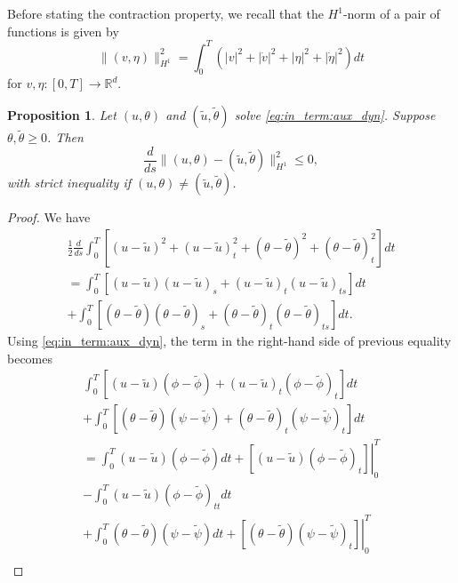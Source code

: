 \documentclass[12pt]{amsart}
\newcommand{\Rr}{{\mathbb{R}}}
\newcommand{\1}{{\chi}}
\newcommand{\lb}{\left(}
\newcommand{\rb}{\right)}
\newtheorem{pro}{Proposition}
\theoremstyle{definition}
\begin{document}
                Before stating the contraction property, we recall that the $H^1$-norm of a pair of functions is given by
                \[
                	\|(v, \eta)\|_{H^1}^2 = \int_0^T \lb |v|^2+|\dot v|^2+|\eta|^2+|\dot \eta|^2\rb dt
                \]
				for $v,\eta:[0,T]\to \Rr^d$. 
                \begin{pro}\label{contra1}
                        Let $(u, \theta)$ and $(\tilde u, \tilde \theta)$ solve \eqref{eq:in_term:aux_dyn}. Suppose $\theta, \tilde \theta \geq 0$. 
                        Then
                        \[
                        \frac{d}{ds}\|(u, \theta)-(\tilde u, \tilde \theta)\|^2_{H^1} \leq 0,
                        \]
                        with strict inequality if $(u, \theta)\neq (\tilde u, \tilde \theta)$.
                \end{pro}
                \begin{proof}
                	{We have
					\begin{equation*}
						\begin{split}
							\frac{1}{2} \frac{d}{ds} \int_0^T \left[ (u-\tilde u)^2 + (u-\tilde u)^2_t + (\theta-\tilde \theta)^2 + (\theta - \tilde \theta)^2_t \right]dt\\
							= \int_0^T \left[(u-\tilde u) (u-\tilde u)_s + (u-\tilde u)_t (u-\tilde u)_{ts}\right] dt\\
							+ \int_0^T \left[ (\theta-\tilde \theta)(\theta-\tilde \theta)_s  + (\theta-\tilde \theta)_t (\theta-\tilde \theta)_{ts}\right] dt.
						\end{split}
					\end{equation*}
					Using \eqref{eq:in_term:aux_dyn},  the term in the right-hand side of previous equality becomes
					\begin{equation*}
						\begin{split}
							\int_0^T \left[(u-\tilde u) (\phi-\tilde \phi) + (u-\tilde u)_t (\phi-\tilde \phi)_t \right] dt\\
							 + \int_0^T \left[  (\theta-\tilde \theta) (\psi - \tilde \psi) 
							 + (\theta-\tilde \theta)_t(\psi-\tilde \psi)_t\right] dt\\
							 = \int_0^T (u-\tilde u) (\phi-\tilde \phi) dt + \left.\left[(u-\tilde u)(\phi-\tilde \phi)_t \right]\right|_0^T \\
							 - \int_0^T (u-\tilde u)(\phi- \tilde \phi)_{tt} dt \\
							 + \int_0^T (\theta-\tilde \theta) (\psi-\tilde \psi)dt + \left.\left[(\theta-\tilde \theta)(\psi-\tilde \psi)_t \right]\right|_0^T \\

\end{split}
\end{equation*}}
\end{proof}
\end{document}
